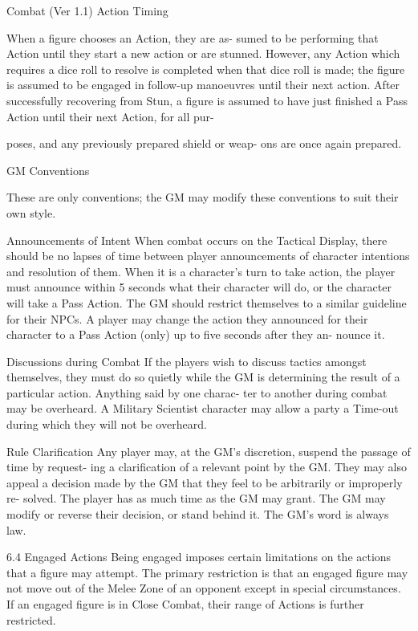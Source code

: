 \begin{Chapter}{Combat (Ver 1.1)}
Action Timing 

When  a  figure  chooses  an  Action,  they  are  as-
sumed to be performing that Action until they start 
a new action or are stunned. However, any Action 
which  requires  a  dice  roll  to  resolve  is  completed 
when  that  dice  roll  is  made;  the  figure  is  assumed 
to  be  engaged  in  follow-up  manoeuvres  until  their 
next  action.  After  successfully  recovering  from 
Stun,  a  figure  is  assumed  to  have  just  finished  a 
Pass  Action  until  their  next  Action,  for  all  pur-

poses, and any previously prepared shield or weap-
ons are once again prepared. 

GM Conventions 

These  are  only  conventions;  the  GM  may  modify 
these conventions to suit their own style. 

Announcements  of  Intent  When  combat  occurs 
on  the  Tactical  Display,  there  should  be  no  lapses 
of time between player announcements of character 
intentions  and  resolution  of  them.  When  it  is  a 
character’s  turn  to  take  action,  the  player  must 
announce  within  5  seconds  what  their  character 
will  do,  or  the  character  will  take  a  Pass  Action. 
The  GM  should  restrict  themselves  to  a  similar 
guideline for their NPCs. A player may change the 
action they announced for their character to a Pass 
Action  (only)  up  to  five  seconds  after  they  an-
nounce it. 

Discussions during Combat If the players wish to 
discuss  tactics  amongst  themselves,  they  must  do 
so  quietly  while  the  GM  is  determining  the  result 
of a particular action. Anything said by one charac-
ter to another during combat may be overheard. A 
Military  Scientist  character  may  allow  a  party  a 
Time-out during which they will not be overheard. 

Rule  Clarification  Any  player  may,  at  the  GM’s 
discretion, suspend the passage of time by request-
ing  a  clarification  of  a  relevant  point  by  the  GM. 
They may also appeal a decision made by the GM 
that  they  feel  to  be  arbitrarily  or  improperly  re-
solved.  The  player  has  as  much  time  as  the  GM 
may  grant.  The  GM  may  modify  or  reverse  their 
decision,  or  stand  behind  it.  The  GM’s  word  is 
always law. 

6.4 Engaged Actions 
Being  engaged  imposes  certain  limitations  on  the 
actions  that  a  figure  may  attempt.  The  primary 
restriction is that an engaged figure may not move 
out  of  the  Melee  Zone  of  an  opponent  except  in 
special  circumstances.  If  an  engaged  figure  is  in 
Close  Combat,  their  range  of  Actions  is  further 
restricted. 


\end{Chapter}
